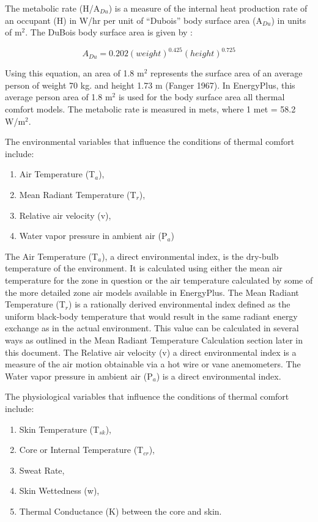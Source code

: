 The metabolic rate (H/A\(_{Du}\)) is a measure of the internal heat production rate of an occupant (H) in W/hr per unit of ``Dubois'' body surface area (A\(_{Du}\)) in units of m\(^{2}\). The DuBois body surface area is given by :

\begin{equation}
{A_{Du}} = 0.202{(weight)^{0.425}}{(height)^{0.725}}
\end{equation}

Using this equation, an area of 1.8 m\(^{2}\) represents the surface area of an average person of weight 70 kg. and height 1.73 m (Fanger 1967).  In EnergyPlus, this average person area of 1.8 m\(^{2}\) is used for the body surface area all thermal comfort models.  The metabolic rate is measured in mets, where 1 met = 58.2 W/m\(^{2}\).

The environmental variables that influence the conditions of thermal comfort include:

\begin{enumerate}
\def\labelenumi{(\arabic{enumi})}
\item
  Air Temperature (T\(_{a}\)),
\item
  Mean Radiant Temperature (T\(_{r}\)),
\item
  Relative air velocity (v),
\item
  Water vapor pressure in ambient air (P\(_{a}\))
\end{enumerate}

The Air Temperature (T\(_{a}\)), a direct environmental index, is the dry-bulb temperature of the environment. It is calculated using either the mean air temperature for the zone in question or the air temperature calculated by some of the more detailed zone air models available in EnergyPlus. The Mean Radiant Temperature (T\(_{r}\)) is a rationally derived environmental index defined as the uniform black-body temperature that would result in the same radiant energy exchange as in the actual environment. This value can be calculated in several ways as outlined in the Mean Radiant Temperature Calculation section later in this document.  The Relative air velocity (v) a direct environmental index is a measure of the air motion obtainable via a hot wire or vane anemometers. The Water vapor pressure in ambient air (P\(_{a}\)) is a direct environmental index.

The physiological variables that influence the conditions of thermal comfort include:

\begin{enumerate}
\def\labelenumi{(\arabic{enumi})}
\item
  Skin Temperature (T\(_{sk}\)),
\item
  Core or Internal Temperature (T\(_{cr}\)),
\item
  Sweat Rate,
\item
  Skin Wettedness (w),
\item
  Thermal Conductance (K) between the core and skin.
\end{enumerate}

